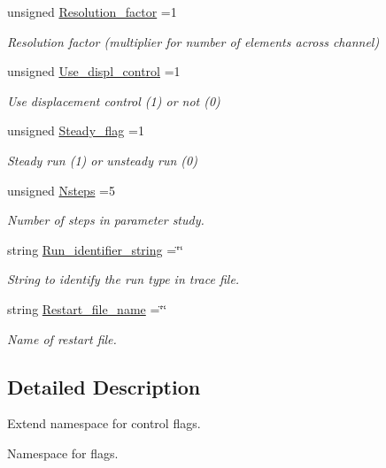 \begin{DoxyCompactItemize}
unsigned \hyperlink{namespaceFlags_a7c2437aa0b6a4f27df951f1cbcef7337}{Resolution\+\_\+factor} =1
\begin{DoxyCompactList}\small\item\em Resolution factor (multiplier for number of elements across channel) \end{DoxyCompactList}\item 
unsigned \hyperlink{namespaceFlags_adf4a2f4076156f633f45155a2d9f67a0}{Use\+\_\+displ\+\_\+control} =1
\begin{DoxyCompactList}\small\item\em Use displacement control (1) or not (0) \end{DoxyCompactList}\item 
unsigned \hyperlink{namespaceFlags_a94cadbe3202fa6f29b6aa5e7b491a9ae}{Steady\+\_\+flag} =1
\begin{DoxyCompactList}\small\item\em Steady run (1) or unsteady run (0) \end{DoxyCompactList}\item 
unsigned \hyperlink{namespaceFlags_a8a6ffdb261330ef89965624209ab7b00}{Nsteps} =5
\begin{DoxyCompactList}\small\item\em Number of steps in parameter study. \end{DoxyCompactList}\item 
string \hyperlink{namespaceFlags_a4401f7e5174d2dc44ec0e7a0d94869af}{Run\+\_\+identifier\+\_\+string} =\char`\"{}\char`\"{}
\begin{DoxyCompactList}\small\item\em String to identify the run type in trace file. \end{DoxyCompactList}\item 
string \hyperlink{namespaceFlags_a3657ad4e287c8756f096b2abe1277cf3}{Restart\+\_\+file\+\_\+name} =\char`\"{}\char`\"{}
\begin{DoxyCompactList}\small\item\em Name of restart file. \end{DoxyCompactList}\end{DoxyCompactItemize}


\subsection{Detailed Description}
Extend namespace for control flags. 

Namespace for flags. 

